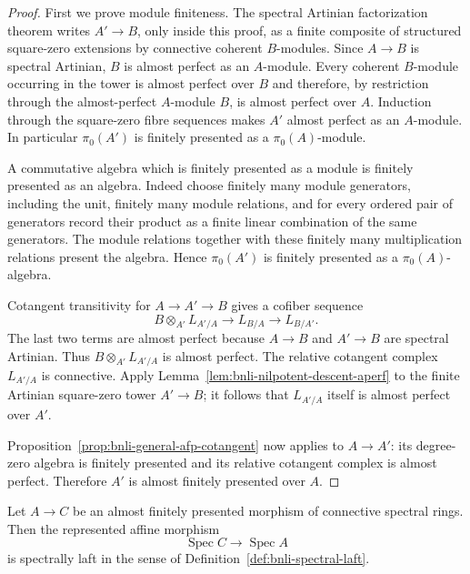 \begin{proof}
First we prove module finiteness.  The spectral Artinian factorization theorem
writes $A'\to B$, only inside this proof, as a finite composite of structured
square-zero extensions by connective coherent $B$-modules.  Since $A\to B$ is
spectral Artinian, $B$ is almost perfect as an $A$-module.  Every coherent
$B$-module occurring in the tower is almost perfect over $B$ and therefore,
by restriction through the almost-perfect $A$-module $B$, is almost perfect
over $A$.  Induction through the square-zero fibre sequences makes $A'$ almost
perfect as an $A$-module.  In particular $\pi_0(A')$ is finitely presented as
a $\pi_0(A)$-module.

A commutative algebra which is finitely presented as a module is finitely
presented as an algebra.  Indeed choose finitely many module generators,
including the unit, finitely many module relations, and for every ordered pair
of generators record their product as a finite linear combination of the same
generators.  The module relations together with these finitely many
multiplication relations present the algebra.  Hence
$\pi_0(A')$ is finitely presented as a $\pi_0(A)$-algebra.

Cotangent transitivity for $A\to A'\to B$ gives a cofiber sequence
\[
    B\otimes_{A'}L_{A'/A}
    \longrightarrow
    L_{B/A}
    \longrightarrow
    L_{B/A'}.
\]
The last two terms are almost perfect because $A\to B$ and $A'\to B$ are
spectral Artinian.  Thus $B\otimes_{A'}L_{A'/A}$ is almost perfect.  The
relative cotangent complex $L_{A'/A}$ is connective.  Apply
Lemma~\ref{lem:bnli-nilpotent-descent-aperf} to the finite Artinian
square-zero tower $A'\to B$; it follows that $L_{A'/A}$ itself is almost
perfect over $A'$.

Proposition~\ref{prop:bnli-general-afp-cotangent} now applies to $A\to A'$:
its degree-zero algebra is finitely presented and its relative cotangent
complex is almost perfect.  Therefore $A'$ is almost finitely presented over
$A$.
\end{proof}

\begin{lemma}
\label{lem:bnli-affine-afp-laft}
Let $A\to C$ be an almost finitely presented morphism of connective spectral
rings.  Then the represented affine morphism
\[
    \operatorname{Spec}C
    \longrightarrow
    \operatorname{Spec}A
\]
is spectrally laft in the sense of
Definition~\ref{def:bnli-spectral-laft}.
\end{lemma}

